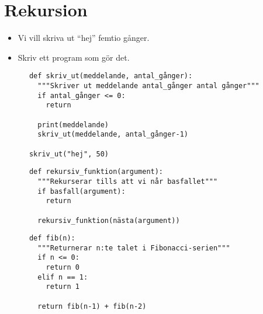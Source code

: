 \mode*

\section{Rekursion}

\begin{frame}
  \begin{exercise}
    \begin{itemize}
      \item Vi vill skriva ut \enquote{hej} femtio gånger.
      \item Skriv ett program som gör det.
    \end{itemize}
  \end{exercise}
\end{frame}

\begin{frame}[fragile]
  \begin{solution}
    \begin{verbatim}
      def skriv_ut(meddelande, antal_gånger):
        """Skriver ut meddelande antal_gånger antal gånger"""
        if antal_gånger <= 0:
          return

        print(meddelande)
        skriv_ut(meddelande, antal_gånger-1)

      skriv_ut("hej", 50)
    \end{verbatim}
  \end{solution}
\end{frame}

\begin{frame}[fragile]
  \begin{definition}[Rekursion]
    \begin{verbatim}
      def rekursiv_funktion(argument):
        """Rekurserar tills att vi når basfallet"""
        if basfall(argument):
          return

        rekursiv_funktion(nästa(argument))
    \end{verbatim}
  \end{definition}
\end{frame}

\begin{frame}[fragile]
  \begin{example}[Fibonacci]
    \begin{verbatim}
      def fib(n):
        """Returnerar n:te talet i Fibonacci-serien"""
        if n <= 0:
          return 0
        elif n == 1:
          return 1

        return fib(n-1) + fib(n-2)
    \end{verbatim}
  \end{example}
\end{frame}

